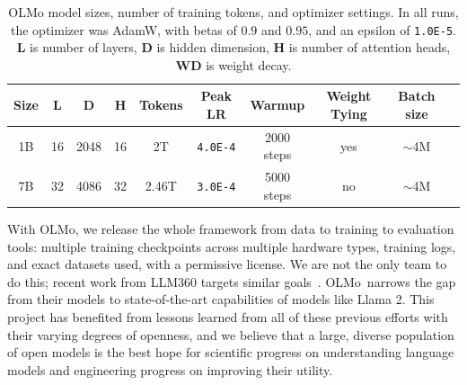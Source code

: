 \documentclass[11pt]{article}
\newcommand{\olmo}{OLMo\xspace}
\newcommand{\note}[4][]{\todo[author=#2,color=#3,fancyline,caption={}]{#4}} %
\newcommand{\kyler}[2][]{\note[#1]{\texttt{kyler}}{green!40}{#2}}
\newcommand{\iz}[2][]{\note[#1]{\texttt{Iz}}{teal!40}{#2}}
\begin{document}
\begin{table}[t]
    \centering
    \begin{tabular}{c|cccc|ccccc}
        \toprule
        \textbf{Size} & \textbf{L} & \textbf{D} & \textbf{H} & \textbf{Tokens} & \textbf{Peak LR} & \textbf{Warmup} & \textbf{Weight Tying} & \textbf{Batch size} \\
        \hline
        1B & 16 & 2048 & 16 & 2T & \texttt{4.0E-4} & 2000 steps & yes & $\sim$4M \\
        7B & 32 & 4086 & 32 & 2.46T & \texttt{3.0E-4} & 5000 steps & no & $\sim$4M \\
        \bottomrule
    \end{tabular}
    \caption{\olmo model sizes, number of training tokens, and optimizer settings. In all runs, the optimizer was AdamW, with betas of $0.9$ and $0.95$, and an epsilon of \texttt{1.0E-5}.
    \textbf{L} is number of layers, \textbf{D} is hidden dimension, \textbf{H} is number of attention heads, \textbf{WD} is weight decay. 
    }
    \label{tab:model_size_and_optimizer}
\end{table}

With \olmo, we release the whole framework from data to training to evaluation tools: multiple training checkpoints across multiple hardware types, training logs, and exact datasets used, with a permissive license.
We are not the only team to do this; recent work from LLM360 targets similar goals~\citep{liu2023llm360}.
\olmo~narrows the gap from their models to state-of-the-art capabilities of models like Llama 2. This project has benefited from lessons learned from all of these previous efforts with their varying degrees of openness, and we believe that a large, diverse population of open models is the best hope for scientific progress on understanding language models and engineering progress on improving their utility.
\end{document}
